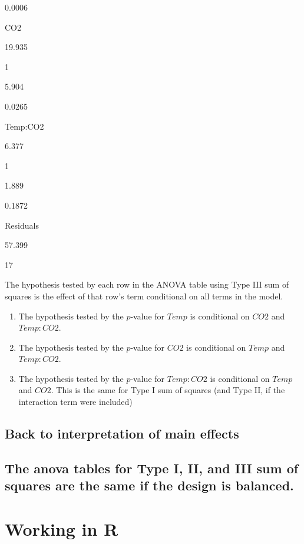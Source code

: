 \documentclass[]{book}
\begin{document}
0.0006

CO2

19.935

1

5.904

0.0265

Temp:CO2

6.377

1

1.889

0.1872

Residuals

57.399

17

The hypothesis tested by each row in the ANOVA table using Type III sum of squares is the effect of that row's term conditional on all terms in the model.

\begin{enumerate}
\def\labelenumi{\arabic{enumi}.}
\item
  The hypothesis tested by the \(p\)-value for \(Temp\) is conditional on \(CO2\) and \(Temp:CO2\).
\item
  The hypothesis tested by the \(p\)-value for \(CO2\) is conditional on \(Temp\) and \(Temp:CO2\).
\item
  The hypothesis tested by the \(p\)-value for \(Temp:CO2\) is conditional on \(Temp\) and \(CO2\). This is the same for Type I sum of squares (and Type II, if the interaction term were included)
\end{enumerate}

\hypertarget{back-to-interpretation-of-main-effects}{%
\subsection{Back to interpretation of main effects}\label{back-to-interpretation-of-main-effects}}

\hypertarget{the-anova-tables-for-type-i-ii-and-iii-sum-of-squares-are-the-same-if-the-design-is-balanced.}{%
\subsection{The anova tables for Type I, II, and III sum of squares are the same if the design is balanced.}\label{the-anova-tables-for-type-i-ii-and-iii-sum-of-squares-are-the-same-if-the-design-is-balanced.}}

\hypertarget{working-in-r-5}{%
\section{Working in R}\label{working-in-r-5}}
\end{document}
